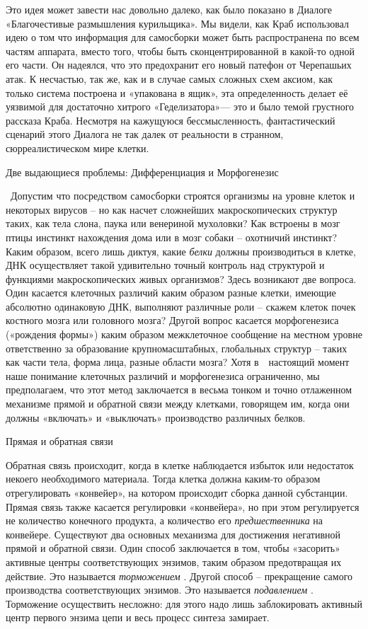 \documentclass[../main.tex]{subfiles}
\begin{document}
Это идея может завести нас довольно далеко, как было показано в Диалоге «Благочестивые размышления курильщика». Мы видели, как Краб использовал идею о том что информация для самосборки может быть распространена по всем частям аппарата, вместо того, чтобы быть сконцентрированной в какой-то одной его части. Он надеялся, что это предохранит его новый патефон от Черепашьих атак. К несчастью, так же, как и в случае самых сложных схем аксиом, как только система построена и «упакована в ящик», эта определенность делает её уязвимой для достаточно хитрого «Геделизатора»--- это и было темой грустного рассказа Краба. Несмотря на кажущуюся бессмысленность, фантастический сценарий этого Диалога не так далек от реальности в странном, сюрреалистическом мире клетки.

Две выдающиеся проблемы: Дифференциация и Морфогенезис

~Допустим что посредством самосборки строятся организмы на уровне клеток и некоторых вирусов \--- но как насчет сложнейших макроскопических структур таких, как тела слона, паука или венериной мухоловки? Как встроены в мозг птицы инстинкт нахождения дома или в мозг собаки \--- охотничий инстинкт? Каким образом, всего лишь диктуя, какие \emph{белки} должны производиться в клетке, ДНК осуществляет такой удивительно точный контроль над структурой и функциями макроскопических живых организмов? Здесь возникают две вопроса. Один касается клеточных различий каким образом разные клетки, имеющие абсолютно одинаковую ДНК, выполняют различные роли \--- скажем клеток почек костного мозга или головного мозга? Другой вопрос касается морфогенезиса («рождения формы») каким образом межклеточное сообщение на местном уровне ответственно за образование крупномасштабных, глобальных структур \--- таких как части тела, форма лица, разные области мозга? Хотя в~~настоящий момент наше понимание клеточных различий и морфогенезиса ограниченно, мы предполагаем, что этот метод заключается в весьма тонком и точно отлаженном механизме прямой и обратной связи между клетками, говорящем им, когда они должны «включать» и «выключать» производство различных белков.

Прямая и обратная связи

Обратная связь происходит, когда в клетке наблюдается избыток или недостаток некоего необходимого материала. Тогда клетка должна каким-то образом отрегулировать «конвейер», на котором происходит сборка данной субстанции. Прямая связь также касается регулировки «конвейера», но при этом регулируется не количество конечного продукта, а количество его \emph{предшественника} на конвейере. Существуют два основных механизма для достижения негативной прямой и обратной связи. Один способ заключается в том, чтобы «засорить» активные центры соответствующих энзимов, таким образом предотвращая их действие. Это называется \emph{торможением} . Другой способ \--- прекращение самого производства соответствующих энзимов. Это называется \emph{подавлением} . Торможение осуществить несложно: для этого надо лишь заблокировать активный центр первого энзима цепи и весь процесс синтеза замирает.
\end{document}
